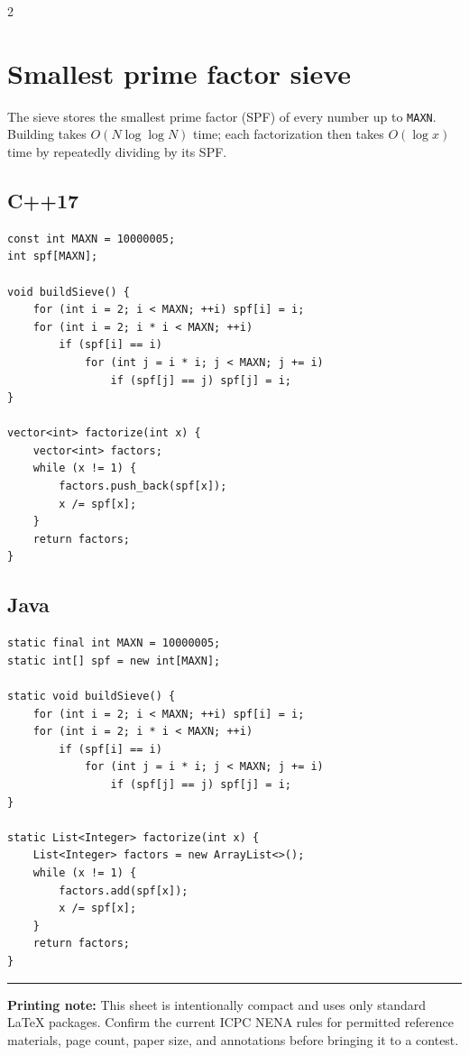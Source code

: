 \documentclass[10pt]{article}
\newcommand{\code}[1]{\texttt{#1}}
\begin{document}
\begin{multicols}{2}
\section{Smallest prime factor sieve}
The sieve stores the smallest prime factor (SPF) of every number up to
\code{MAXN}. Building takes $O(N\log\log N)$ time; each factorization then
takes $O(\log x)$ time by repeatedly dividing by its SPF.

\subsection{C++17}
\begin{framed}
\scriptsize
\begin{verbatim}
const int MAXN = 10000005;
int spf[MAXN];

void buildSieve() {
    for (int i = 2; i < MAXN; ++i) spf[i] = i;
    for (int i = 2; i * i < MAXN; ++i)
        if (spf[i] == i)
            for (int j = i * i; j < MAXN; j += i)
                if (spf[j] == j) spf[j] = i;
}

vector<int> factorize(int x) {
    vector<int> factors;
    while (x != 1) {
        factors.push_back(spf[x]);
        x /= spf[x];
    }
    return factors;
}
\end{verbatim}
\end{framed}

\subsection{Java}
\begin{framed}
\scriptsize
\begin{verbatim}
static final int MAXN = 10000005;
static int[] spf = new int[MAXN];

static void buildSieve() {
    for (int i = 2; i < MAXN; ++i) spf[i] = i;
    for (int i = 2; i * i < MAXN; ++i)
        if (spf[i] == i)
            for (int j = i * i; j < MAXN; j += i)
                if (spf[j] == j) spf[j] = i;
}

static List<Integer> factorize(int x) {
    List<Integer> factors = new ArrayList<>();
    while (x != 1) {
        factors.add(spf[x]);
        x /= spf[x];
    }
    return factors;
}
\end{verbatim}
\end{framed}

\end{multicols}

\vfill
\hrule
\small
\textbf{Printing note:} This sheet is intentionally compact and uses only standard
LaTeX packages. Confirm the current ICPC NENA rules for permitted reference
materials, page count, paper size, and annotations before bringing it to a contest.
\end{document}
